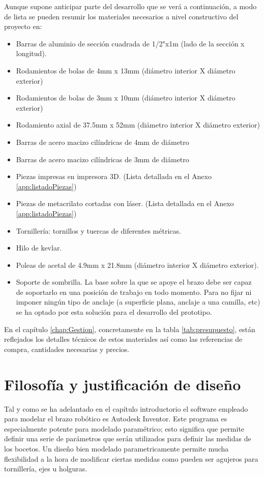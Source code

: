     Aunque supone anticipar parte del desarrollo que se verá a continuación, a modo de lista se pueden resumir los materiales necesarios a nivel constructivo del proyecto en:
    \begin{itemize}
        \item Barras de aluminio de sección cuadrada de 1/2"x1m (lado de la sección x longitud).
        \item Rodamientos de bolas de 4mm x 13mm (diámetro interior X diámetro exterior)
        \item Rodamientos de bolas de 3mm x 10mm (diámetro interior X diámetro exterior)
        \item Rodamiento axial de 37.5mm x 52mm (diámetro interior X diámetro exterior)
        \item Barras de acero macizo cilíndricas de 4mm de diámetro
        \item Barras de acero macizo cilíndricas de 3mm de diámetro
        \item Piezas impresas en impresora 3D. (Lista detallada en el Anexo \ref{app:listadoPiezas})
        \item Piezas de metacrilato cortadas con láser. (Lista detallada en el Anexo \ref{app:listadoPiezas})
        \item Tornillería: tornillos y tuercas de diferentes métricas.
        \item Hilo de kevlar.
        \item Poleas de acetal de 4.9mm x 21.8mm (diámetro interior X diámetro exterior).
        \item Soporte de sombrilla. La base sobre la que se apoye el brazo debe ser capaz de soportarlo en una posición de trabajo en todo momento. Para no fijar ni imponer ningún tipo de anclaje (a superficie plana, anclaje a una camilla, etc) se ha optado por esta solución para el desarrollo del prototipo.
    \end{itemize}

    En el capítulo \ref{chap:Gestion}, concretamente en la tabla \ref{tab:presupuesto}, están reflejados los detalles técnicos de estos materiales así como las referencias de compra, cantidades necesarias y precios.

\section{Filosofía y justificación de diseño} \label{sec:Mecanica:filosofia_diseno}

    Tal y como se ha adelantado en el capítulo introductorio el software empleado para modelar el brazo robótico es Autodesk Inventor. Este programa es especialmente potente para modelado paramétrico; esto significa que permite definir una serie de parámetros que serán utilizados para definir las medidas de los bocetos. Un diseño bien modelado parametricamente permite mucha flexibilidad a la hora de modificar ciertas medidas como pueden ser agujeros para tornillería, ejes u holguras.
    \\

